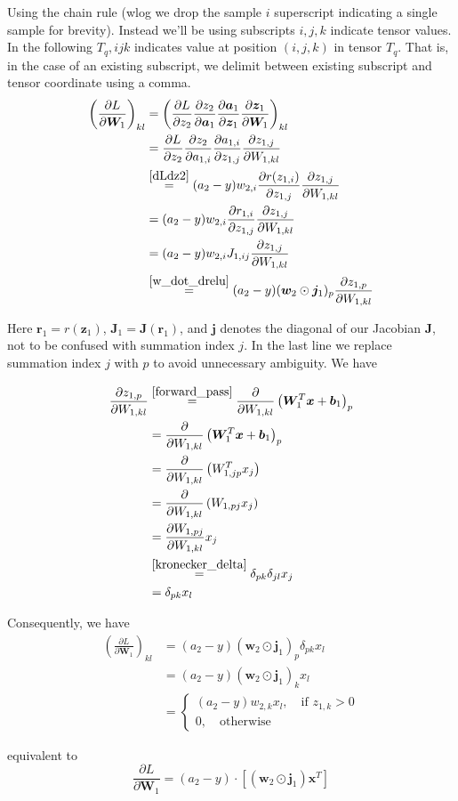 \documentclass[varwidth,border=2cm]{standalone}
\newcommand{\pd}[2]{\frac{\partial #1}{\partial #2}}
\newcommand{\req}[1]{\overset{\eqref{#1}}{=}}
\begin{document}
Using the chain rule (wlog we drop the sample $i$ superscript indicating a single sample for brevity). Instead we'll be using subscripts $i,j,k$ indicate tensor values. In the following $T_q,ijk$ indicates value at position $(i,j,k)$ in tensor $T_q$. That is, in the case of an existing subscript, we delimit between existing subscript and tensor coordinate using a comma.
\begin{align}
\left(\frac{\partial L}{\partial \bm W_1}\right)_{kl} &= \left( \frac{\partial L}{\partial z_2}\frac{\partial z_2}{\partial \bm a_1}\frac{\partial \bm a_1}{\partial \bm z_1}\frac{\partial \bm z_1}{\partial \bm W_1} \right)_{kl} \\
 &= \frac{\partial L}{\partial z_2}\frac{\partial z_2}{\partial a_{1,i}} \pd{a_{1,i}}{z_{1,j}} \pd{z_{1,j}}{W_{1,kl}} \nonumber \\
 & \req{dLdz2} (a_2 - y) w_{2, i} \pd{r(z_{1,i})}{z_{1,j}} \pd{z_{1,j}}{W_{1,kl}} \nonumber \\
 &= (a_2 - y) w_{2, i} \pd{r_{1,i}}{z_{1,j}} \pd{z_{1,j}}{W_{1,kl}} \nonumber \\
 &= (a_2 - y) w_{2, i} J_{1,ij} \pd{z_{1,j}}{W_{1,kl}} \nonumber \\
 & \req{w_dot_drelu} (a_2 - y) (\bm w_2 \odot \bm j_1)_p \pd{z_{1,p}}{W_{1,kl}} \nonumber
\end{align}

Here $\bm r_1 = r(\bm z_1)$, $\bm J_1 = \bm J(\bm r_1)$, and $\bm j$ denotes the diagonal of our Jacobian $\bm J$, not to be confused with summation index $j$. In the last line we replace summation index $j$ with $p$ to avoid unnecessary ambiguity. We have

\begin{align}
\pd{z_{1,p}}{W_{1,kl}} &\req{forward_pass} \pd{}{W_{1,kl}} \left( \bm W^T_1 \bm x + \bm b_1\right)_p \\
&= \pd{}{W_{1,kl}} \left( \bm W^T_1 \bm x + \bm b_1\right)_p \nonumber \\
&= \pd{}{W_{1,kl}} \left( W^T_{1,jp} x_j \right) \nonumber \\
&= \pd{}{W_{1,kl}} \left( W_{1,pj} x_j \right) \nonumber \\
&= \pd{W_{1,pj}}{W_{1,kl}} x_j \nonumber \\
& \req{kronecker_delta} \delta_{pk} \delta_{jl} x_j \nonumber \\
&= \delta_{pk} x_l \nonumber
\end{align}

Consequently, we have
\begin{align}
\left(\pd{L}{\bm W_1}\right)_{kl} &= (a_2 - y) (\bm w_2 \odot \bm j_1) _p \delta _{pk}x_l \\
&= (a_2 - y) (\bm w_2 \odot \bm j_1) _k x_l \nonumber \\
&= 
\begin{cases}
(a_2 - y) w_{2,k} x_l, \quad \text{if } z_{1,k} > 0 \\
0,\quad\text{otherwise}
\end{cases} \nonumber
\end{align}

equivalent to
\begin{equation}
\pd{L}{\bm W_1} = (a_2 - y) \cdot [(\bm w_2 \odot \bm j_1)\bm x^T] \nonumber
\end{equation}
\end{document}
